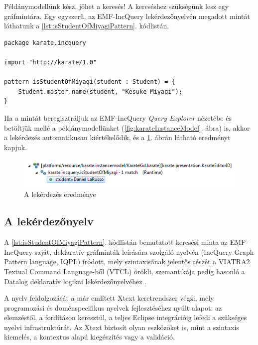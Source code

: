 Példánymodellünk kész, jöhet a keresés!
A kereséshez szükségünk lesz egy gráfmintára.
Egy egyszerű, az EMF-IncQuery lekérdezőnyelvén megadott mintát láthatunk a \ref{lst:isStudentOfMiyagiPattern}. kódlistán.
%
\begin{lstlisting}[float,floatplacement=htb,caption=isStudentOfMiyagi gráfminta a tárgynyelven,label=lst:isStudentOfMiyagiPattern]
package karate.incquery

import "http://karate/1.0"

pattern isStudentOfMiyagi(student : Student) = {
    Student.master.name(student, "Kesuke Miyagi");
}
\end{lstlisting}
%
Ha a mintát beregisztráljuk az EMF-IncQuery \emph{Query Explorer} nézetébe és betöltjük mellé a példánymodellünket (\ref{fig:karateInstanceModel}. ábra) is, akkor a lekérdezés automatikusan kiértékelődik, és a \ref{fig:karateQueryResult}. ábrán látható eredményt kapjuk.
%
\begin{figure}[htb]
\centering
\includegraphics[width=\textwidth]{figures/karate-query-result.png}
\caption{A lekérdezés eredménye}
\label{fig:karateQueryResult}
\end{figure}

\subsection{A lekérdezőnyelv}

A \ref{lst:isStudentOfMiyagiPattern}. kódlistán bemutatott keresési minta az EMF-IncQuery saját, deklaratív gráfminták leírására szolgáló nyelvén (IncQuery Graph Pattern language, IQPL) íródott, mely szintaxisának jelentős részét a VIATRA2 Textual Command Language-ből (VTCL) örökli, szemantikája pedig hasonló a Datalog deklaratív logikai lekérdezőnyelvéhez \cite{Ceri:1989:YAW:627272.627357}.

A nyelv feldolgozását a már említett Xtext keretrendszer végzi, mely programozási és doménspecifikus nyelvek fejlesztéséhez nyúlt alapot: az elemzéstől, a fordításon keresztül, a teljes Eclipse integrációig lefedi a szükséges nyelvi infrastruktúrát.
Az Xtext biztosít olyan eszközöket is, mint a szintaxis kiemelés, a kontextus alapú kiegészítés vagy a validáció.


